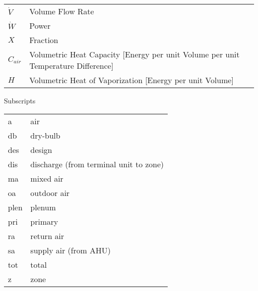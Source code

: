 \begin{longtable}{ll}
\(\dot{V}\) & Volume Flow Rate                                                                  \\
\(\dot{W}\) & Power                                                                             \\
\(X\)       & Fraction                                                                          \\
\(C_{air}\) & \parbox[t]{5in}{Volumetric Heat Capacity [Energy per unit Volume per unit Temperature Difference] } \\
\(H\)       & Volumetric Heat of Vaporization [Energy per unit Volume]                          \\
\end{longtable}


\vspace{2em}

\noindent
Subscripts

\noindent
\begin{tabular}{ll}
    a    & air                                    \\
    db   & dry-bulb                               \\
    des  & design                                 \\
    dis  & discharge (from terminal unit to zone) \\
    ma   & mixed air                              \\
    oa   & outdoor air                            \\
    plen & plenum                                 \\
    pri  & primary                                \\
    ra   & return air                             \\
    sa   & supply air (from AHU)                  \\
    tot  & total                                  \\
    z    & zone                                   \\
\end{tabular}


\pagebreak{}
